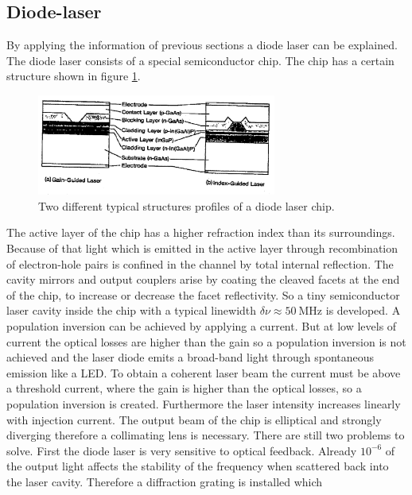 \subsection{Diode-laser}
\label{subsec:diodenlaser}
By applying the information of previous sections
a diode laser can be explained.
The diode laser consists of a special semiconductor chip.
The chip has a certain structure shown in figure \ref{fig:chip}.
\begin{figure}
  \centering
  \includegraphics[width=0.7\textwidth]{chip.png}
  \caption{Two different typical structures profiles of a diode laser chip.\cite{V61}}
  \label{fig:chip}
\end{figure}
The active layer of the chip has a higher refraction index than
its surroundings. Because of that light which is emitted
in the active layer through recombination of electron-hole pairs
is confined in the channel by total internal reflection.
The cavity mirrors and output couplers arise
by coating the cleaved facets at the end of the chip,
to increase or decrease the facet reflectivity.
So a tiny semiconductor laser cavity inside the chip
with a typical linewidth
$\delta \nu \approx \SI{50}{\mega\hertz}$
is developed.
A population inversion
can be achieved by applying a current.
But at low levels of current
the optical losses are higher than the gain
so a population inversion is not achieved and
the laser diode emits a broad-band light
through spontaneous emission
like a LED.
To obtain a coherent laser beam the current must be above
a threshold current, where the gain is higher than the
optical losses, so a population inversion is created.
Furthermore the laser intensity increases linearly with
injection current.
The output beam of the chip is elliptical and strongly diverging
therefore a collimating lens is necessary.
There are still two problems to solve.
First the diode laser is very sensitive to optical feedback.
Already $10^{-6}$ of the output light affects
the stability of the frequency
when scattered back into the
laser cavity.
Therefore a diffraction grating is installed which

